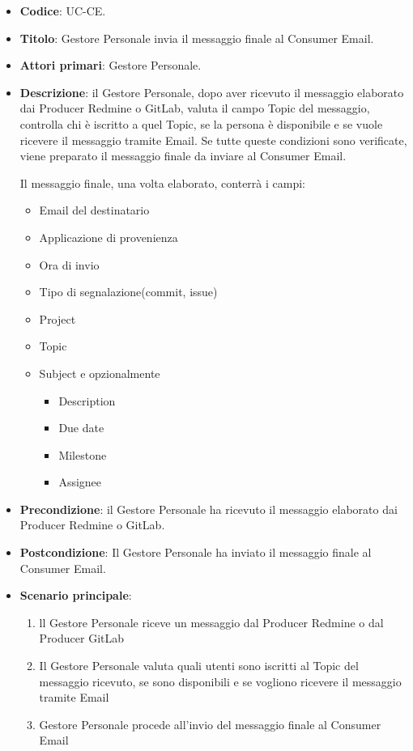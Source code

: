 	\begin{itemize}
		\item \textbf{Codice}: UC\theuccount-CE.
		\item \textbf{Titolo}: Gestore Personale invia il messaggio finale al Consumer Email.
		\item \textbf{Attori primari}: Gestore Personale.
		\item \textbf{Descrizione}: il Gestore Personale, dopo aver ricevuto il messaggio elaborato dai Producer Redmine o GitLab,
		valuta il campo Topic del messaggio, controlla chi è iscritto a quel Topic, se la persona è disponibile e se vuole ricevere
		il messaggio tramite Email. Se tutte queste condizioni sono verificate, viene preparato il messaggio finale da inviare al	Consumer Email.
		
		Il messaggio finale, una volta elaborato, conterrà i campi:
		\begin{itemize}
			\item Email del destinatario
			\item Applicazione di provenienza
			\item Ora di invio
			\item Tipo di segnalazione(commit, issue)
			\item Project
			\item Topic
			\item Subject e opzionalmente
		 	\begin{itemize}
				\item Description
				\item Due date
				\item Milestone
				\item Assignee
			\end{itemize}
		\end{itemize}
		\item \textbf{Precondizione}: il Gestore Personale ha ricevuto il messaggio elaborato dai Producer Redmine o GitLab.
		\item \textbf{Postcondizione}: Il Gestore Personale ha inviato il messaggio finale al Consumer Email.
		\item \textbf{Scenario principale}: 
		\begin{enumerate}
			\item ll Gestore Personale riceve un messaggio dal Producer Redmine o dal Producer GitLab
			\item Il Gestore Personale valuta quali utenti sono iscritti al Topic del messaggio ricevuto, se sono disponibili e se vogliono ricevere il messaggio tramite Email
			\item Gestore Personale procede all'invio del messaggio finale al Consumer Email
		\end{enumerate}
		
	\end{itemize}